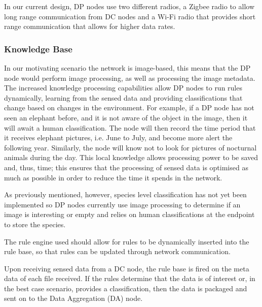 	In our current design, DP nodes use two different radios, a Zigbee radio to allow long range communication from DC nodes and a Wi-Fi radio that provides short range communication that allows for higher data rates.

	\subsubsection{Knowledge Base}
	In our motivating scenario the network is image-based, this means that the DP node would perform image processing, as well as processing the image metadata. The increased knowledge processing capabilities allow DP nodes to run rules dynamically, learning from the sensed data and providing classifications that change based on changes in the environment. For example, if a DP node has not seen an elephant before, and it is not aware of the object in the image, then it will await a human classification. The node will then record the time period that it receives elephant pictures, i.e. June to July, and become more alert the following year. Similarly, the node will know not to look for pictures of nocturnal animals during the day. This local knowledge allows processing power to be saved and, thus, time; this ensures that the processing of sensed data is optimised as much as possible in order to reduce the time it spends in the network.

	As previously mentioned, however, species level classification has not yet been implemented so DP nodes currently use image processing to determine if an image is interesting or empty and relies on human classifications at the endpoint to store the species.
	
	The rule engine used should allow for rules to be dynamically inserted into the rule base, so that rules can be updated through network communication.

	Upon receiving sensed data from a DC node, the rule base is fired on the meta data of each file received. If the rules determine that the data is of interest or, in the best case scenario, provides a classification, then the data is packaged and sent on to the Data Aggregation (DA) node.
	
